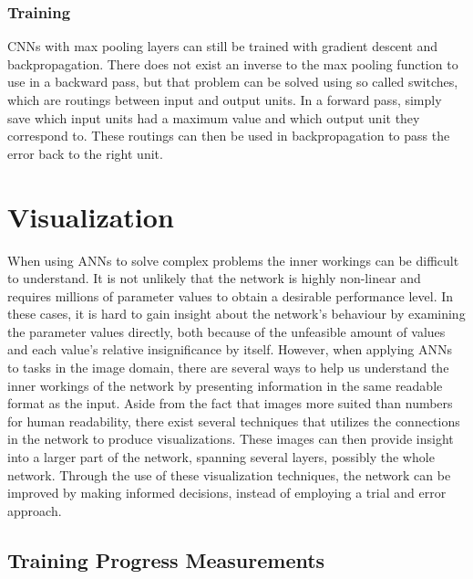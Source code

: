 \subsubsection{Training}

CNNs with max pooling layers can still be trained with gradient descent and backpropagation. There does not exist an inverse to the max pooling function to use in a backward pass, but that problem can be solved using so called switches, which are routings between input and output units. In a forward pass, simply save which input units had a maximum value and which output unit they correspond to. These routings can then be used in backpropagation to pass the error back to the right unit. 


\section{Visualization} \label{visualization-theory}

When using ANNs to solve complex problems the inner workings can be difficult to understand. It is not unlikely that the network is highly non-linear and requires millions of parameter values to obtain a desirable performance level. In these cases, it is hard to gain insight about the network's behaviour by examining the parameter values directly, both because of the unfeasible amount of values and each value's relative insignificance by itself. However, when applying ANNs to tasks in the image domain, there are several ways to help us understand the inner workings of the network by presenting information in the same readable format as the input. Aside from the fact that images more suited than numbers for human readability, there exist several techniques that utilizes the connections in the network to produce visualizations. These images can then provide insight into a larger part of the network, spanning several layers, possibly the whole network. Through the use of these visualization techniques, the network can be improved by making informed decisions, instead of employing a trial and error approach. 

\subsection{Training Progress Measurements}

